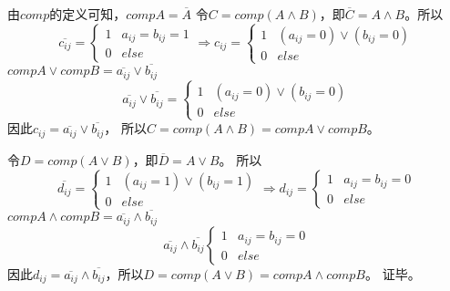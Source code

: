 \documentclass{article}
\begin{document}
由$comp$的定义可知，$compA = \overline{A}$
令$C = comp(A \land B)$，即$\overline{C} = A \land B$。所以
\[
\overline{c_{ij}} =
\begin{cases}
    1 & a_{ij} = b_{ij} = 1\\
    0 & else
\end{cases}
\Rightarrow 
c_{ij} = 
\begin{cases}
    1 & (a_{ij} = 0) \lor (b_{ij} = 0)\\
    0 & else
\end{cases}
\]
$compA \lor compB = \overline{a_{ij}} \lor \overline{b_{ij}}$ 
\[
\overline{a_{ij}} \lor \overline{b_{ij}} = 
\begin{cases}
    1 & (a_{ij} = 0) \lor (b_{ij} = 0)\\
    0 & else
\end{cases}
\]
因此$c_{ij} = \overline{a_{ij}} \lor \overline{b_{ij}}$，
所以$C = comp(A \land B) = compA \lor compB$。

令$D = comp(A \lor B)$，即$\overline{D} = A \lor B$。
所以
\[
\overline{d_{ij}}=
\begin{cases}
    1 & (a_{ij} = 1) \lor (b_{ij} = 1)\\
    0 & else
\end{cases}
\Rightarrow
d_{ij} = 
\begin{cases}
    1 & a_{ij} = b_{ij} = 0\\
    0 & else
\end{cases}
\]
$compA \land compB = \overline{a_{ij}} \land \overline{b_{ij}}$
\[
\overline{a_{ij}} \land \overline{b_{ij}}
\begin{cases}
    1 & a_{ij} = b_{ij} = 0\\
    0 & else
\end{cases}
\]
因此$d_{ij} = \overline{a_{ij}} \land \overline{b_{ij}}$，所以$D = comp(A \lor B) = compA \land compB$。
证毕。
\end{document}
